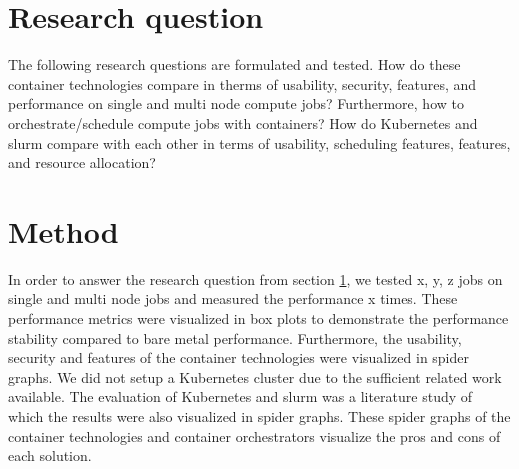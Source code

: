 \documentclass[conference]{IEEEtran}
\begin{document}
\section{Research question}
\label{research-question}
The following research questions are formulated and tested. How do these container technologies compare in therms of usability, security, features, and performance on single and multi node compute jobs? Furthermore, how to orchestrate/schedule compute jobs with containers? How do Kubernetes and \gls{slurm} compare with each other in terms of usability, scheduling features, features, and resource allocation?




\section{Method}
In order to answer the research question from section \ref{research-question}, we tested  x, y, z jobs on single and multi node jobs and measured the performance x times. These performance metrics were visualized in box plots to demonstrate the performance stability compared to bare metal performance. Furthermore, the usability, security and features of the container technologies were visualized in spider graphs. We did not setup a Kubernetes cluster due to the sufficient related work available. The evaluation of Kubernetes and \gls{slurm} was a literature study of which the results were also visualized in spider graphs. These spider graphs of the container technologies and container orchestrators visualize the pros and cons of each solution. 
\end{document}
